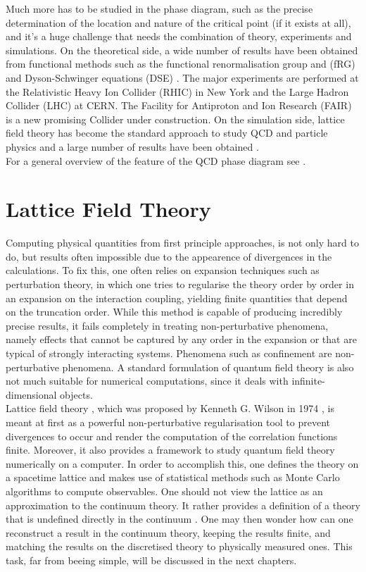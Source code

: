 Much more has to be studied in the phase diagram, such as the precise determination of the location and nature of the critical point (if it exists at all), and it's a huge challenge that needs the combination of theory, experiments and simulations.
On the theoretical side, a wide number of results have been obtained from functional methods such as the functional renormalisation group and (fRG) and Dyson-Schwinger equations (DSE) \cite{QCDphase,QCDphase2,Gao_2021}.
The major experiments are performed at the Relativistic Heavy Ion Collider (RHIC) in New York and the Large Hadron
Collider (LHC) at CERN. The Facility for Antiproton and Ion Research (FAIR) is a new promising Collider under construction. On the simulation side, lattice field theory has become the standard approach to study QCD and particle physics and a large number of results have been obtained \cite{wuppertal,201915,Endroedi_2014}. \\
For a general overview of the feature of the QCD phase diagram see \cite{phasediag1,Bellwied2015}.
\section{Lattice Field Theory}
\vspace{20pt}
Computing physical quantities from first principle approaches, is not only hard to do, but results often impossible due to the appearence of divergences in the calculations. To fix this, one often relies on expansion techniques such as perturbation theory, in which one tries to regularise the theory order by order in an expansion on the interaction coupling, yielding finite quantities that depend on the truncation order.  While this method is capable of producing incredibly precise results, it fails completely in treating non-perturbative phenomena, namely effects that cannot be captured by any order in the expansion or that are typical of strongly interacting systems.
Phenomena such as confinement are non-perturbative phenomena.
A standard formulation of quantum field theory is also not much suitable for numerical computations, since it deals with infinite-dimensional objects. \\
Lattice field theory \cite{Montvay1994QuantumLattice,rothe_LGT,gattringer_LQCD,creutz_2023}, which was proposed by Kenneth G. Wilson in 1974 \cite{wilson_lqcd}, is meant at first as a powerful non-perturbative regularisation tool to prevent divergences to occur and render the computation of the correlation functions finite. Moreover, it also provides a framework to study quantum field theory numerically on a computer. In order to accomplish this, one defines the theory on a spacetime lattice and makes use of statistical methods such as Monte Carlo algorithms to compute observables. 
One should not view the lattice as an approximation to the continuum theory. It rather
provides a definition of a theory that is undefined directly in the continuum \cite{Wiese:2009qsa}. One may then wonder how can one reconstruct a result in the continuum theory, keeping the results finite, and matching the results on the discretised theory to physically measured ones. This task, far from beeing simple, will be  discussed in the next chapters.\

